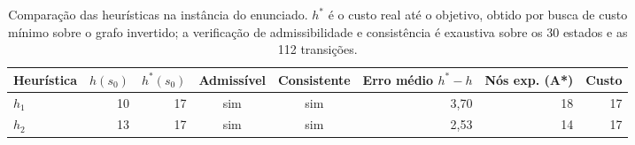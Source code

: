 \documentclass[12pt,a4paper]{article}
\begin{document}

\begin{table}[H]
  \centering
  \caption{Comparação das heurísticas na instância do enunciado. $h^\ast$ é o custo real até o objetivo, obtido por busca de custo mínimo sobre o grafo invertido; a verificação de admissibilidade e consistência é exaustiva sobre os 30 estados e as 112 transições.}
  \label{tab:heuristicas}
  \begin{tabular}{lrrccrrr}
    \toprule
    Heurística & $h(s_0)$ & $h^\ast(s_0)$ & Admissível & Consistente & Erro médio $h^\ast\!-\!h$ & Nós exp. (A*) & Custo \\
    \midrule
    $h_1$ & 10 & 17 & sim & sim & 3,70 & 18 & 17 \\
    $h_2$ & 13 & 17 & sim & sim & 2,53 & 14 & 17 \\
    \bottomrule
  \end{tabular}
\end{table}

\end{document}
